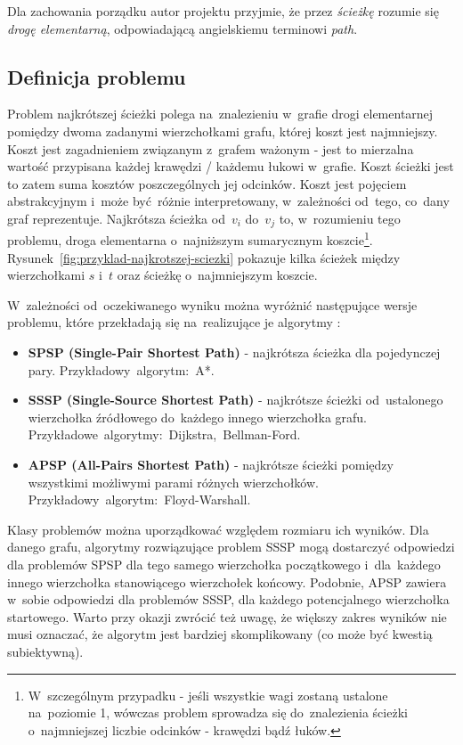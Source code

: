 \documentclass[11pt,a4paper,oneside]{report}
\begin{document}
Dla zachowania porządku autor projektu przyjmie, że przez \textit{ścieżkę} rozumie się \textit{drogę elementarną}, odpowiadającą angielskiemu terminowi \textit{path}.



\subsection{Definicja problemu}

Problem najkrótszej ścieżki polega na~znalezieniu w~grafie drogi elementarnej pomiędzy dwoma zadanymi wierzchołkami grafu, której koszt jest najmniejszy.
Koszt jest zagadnieniem związanym z~grafem ważonym - jest to mierzalna wartość przypisana każdej krawędzi / każdemu łukowi w~grafie. Koszt ścieżki jest to zatem suma kosztów poszczególnych jej odcinków. Koszt jest pojęciem abstrakcyjnym i~może być różnie interpretowany, w~zależności od~tego, co~dany graf reprezentuje. Najkrótsza ścieżka od~$v_i$ do~$v_j$ to, w~rozumieniu tego problemu, droga elementarna o~najniższym sumarycznym koszcie\footnote{W~szczególnym przypadku - jeśli wszystkie wagi zostaną ustalone na~poziomie 1, wówczas problem sprowadza się do~znalezienia ścieżki o~najmniejszej liczbie odcinków - krawędzi bądź łuków.}. Rysunek~\ref{fig:przyklad-najkrotszej-sciezki} pokazuje kilka ścieżek między wierzchołkami $s$ i~$t$ oraz ścieżkę o~najmniejszym koszcie.



W~zależności od~oczekiwanego wyniku można wyróżnić następujące wersje problemu, które przekładają się na~realizujące je algorytmy \cite{esparza-2025-shortestpaths}:
\begin{itemize}
	\item \textbf{SPSP (Single-Pair Shortest Path)} - najkrótsza ścieżka dla pojedynczej pary. Przykładowy~algorytm:~A*.
	\item \textbf{SSSP (Single-Source Shortest Path)} - najkrótsze ścieżki od~ustalonego wierzchołka źródłowego do~każdego innego wierzchołka grafu. Przykładowe~algorytmy:~Dijkstra,~Bellman-Ford.
	\item \textbf{APSP (All-Pairs Shortest Path)} - najkrótsze ścieżki pomiędzy wszystkimi możliwymi parami różnych wierzchołków. Przykładowy~algorytm:~Floyd-Warshall.
\end{itemize}



Klasy problemów można uporządkować względem rozmiaru ich wyników. Dla danego grafu, algorytmy rozwiązujące problem SSSP mogą dostarczyć odpowiedzi dla problemów SPSP dla tego samego wierzchołka początkowego i~dla~każdego innego wierzchołka stanowiącego wierzchołek końcowy. Podobnie, APSP zawiera w~sobie odpowiedzi dla problemów SSSP, dla każdego potencjalnego wierzchołka startowego. Warto przy okazji zwrócić też uwagę, że większy zakres wyników nie musi oznaczać, że algorytm jest bardziej skomplikowany (co może być kwestią subiektywną).
\end{document}
